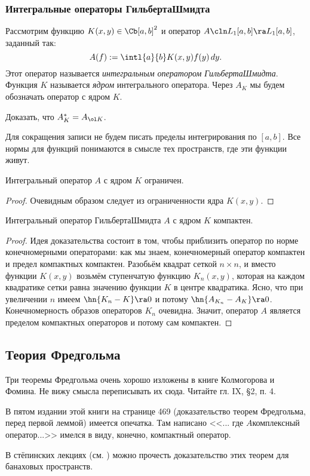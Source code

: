 \documentclass[a4paper]{article}
\begin{document}
\subsubsection{Интегральные операторы Гильберта\ч Шмидта}

\begin{df}
Рассмотрим функцию $K(x,y) \in \Cb[a,b]^2$ и
оператор $A\cln L_1[a,b] \ra L_1[a,b]$, заданный так:
$$A(f) := \intl{a}{b}K(x,y)f(y)\,dy.$$
Этот оператор называется \emph{интегральным оператором Гильберта\ч Шмидта}.
Функция $K$ называется \emph{ядром} интегрального оператора. Через $A_K$ мы будем обозначать
оператор с ядром $K$.
\end{df}

\begin{problem}
Доказать, что $A_K^* = A_{\ol K}$.
\end{problem}

Для сокращения записи не будем писать пределы интегрирования по $[a,b]$.
Все нормы для функций понимаются в смысле тех пространств, где эти функции живут.

\begin{stm}
Интегральный оператор $A$ с ядром $K$ ограничен.
\end{stm}
\begin{proof}
Очевидным образом следует из ограниченности ядра $K(x,y)$.
\end{proof}

\begin{theorem}
Интегральный оператор Гильберта\ч Шмидта $A$ с ядром $K$ компактен.
\end{theorem}
\begin{proof}
Идея доказательства состоит в том, чтобы приблизить оператор по норме конечномерными операторами: как мы знаем,
конечномерный оператор компактен и предел компактных компактен. Разобьём квадрат сеткой $n\times n$, и вместо
функции $K(x,y)$ возьмём ступенчатую функцию $K_n(x,y)$, которая на каждом квадратике сетки равна значению функции $K$
в центре квадратика. Ясно, что при увеличении $n$ имеем $\hn{K_n-K}\ra 0$ и потому $\hn{A_{K_n}-A_K}\ra 0$.
Конечномерность образов операторов $K_n$ очевидна. Значит, оператор $A$ является пределом компактных
операторов и потому сам компактен.
\end{proof}

\subsection{Теория Фредгольма}

Три теоремы Фредгольма очень хорошо изложены в книге Колмогорова и  Фомина. Не вижу смысла
переписывать их сюда. Читайте гл. IX, \S 2, п. 4.

\begin{note}
В пятом издании этой книги на странице 469 (доказательство теорем Фредгольма, перед первой леммой) имеется опечатка.
Там написано <<... где $A$\т комплексный оператор...>> имелся в виду, конечно, компактный оператор.
\end{note}

В стёпинских лекциях (см. \dmvnwebsite) можно прочесть доказательство этих теорем для банаховых пространств.

\newpage
\scriptsize

\end{document}
